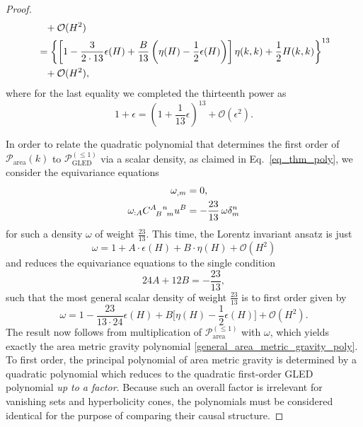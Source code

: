 \begin{proof}
\begin{equation}
\begin{aligned}
                              &{} \hphantom{=} + \mathcal O(H^2) \\
                              &{} = \left\{ \left\lbrack 1 - \frac{3}{2\cdot 13} \epsilon(H) + \frac{B}{13}\left(\eta(H) - \frac{1}{2}\epsilon(H) \right)\right\rbrack \eta(k,k) + \frac{1}{2} H(k,k) \right\}^{13} \\
                              &{} \hphantom{=} + \mathcal O(H^2),
  \end{aligned}
\end{equation}
where for the last equality we completed the thirteenth power as
\begin{equation}
  1 + \epsilon = \left( 1 + \frac{1}{13}\epsilon\right)^{13} + \mathcal O(\epsilon^2).
\end{equation}

In order to relate the quadratic polynomial that determines the first order of $\mathcal P_\text{area}(k)$ to $\mathcal P_\text{GLED}^{(\leq 1)}$ via a scalar density, as claimed in Eq.~\eqref{eq_thm_poly}, we consider the equivariance equations
\begin{equation}
  \begin{aligned}
    \omega_{,m} &{} = 0, \\
    \omega_{:A} \gmc{A}{B}{n}{m} u^B &{} = -\frac{23}{13}\,\omega \delta^n_m
  \end{aligned}
\end{equation}
for such a density $\omega$ of weight $\frac{23}{13}$. This time, the Lorentz invariant ansatz is just
\begin{equation}
  \omega = 1 + A\cdot \epsilon(H) + B\cdot \eta(H) + \mathcal O(H^2)
\end{equation}
and reduces the equivariance equations to the single condition
\begin{equation}
  24A + 12B = -\frac{23}{13},
\end{equation}
such that the most general scalar density of weight $\frac{23}{13}$ is to first order given by
\begin{equation}
  \omega = 1 - \frac{23}{13\cdot 24} \epsilon(H) + B \lbrack \eta(H) - \frac{1}{2} \epsilon(H)\rbrack + \mathcal O(H^2).
\end{equation}
The result now follows from multiplication of $\mathcal P_\text{area}^{(\leq 1)}$ with $\omega$, which yields exactly the area metric gravity polynomial \eqref{general_area_metric_gravity_poly}. To first order, the principal polynomial of area metric gravity is determined by a quadratic polynomial which reduces to the quadratic first-order GLED polynomial \emph{up to a factor}. Because such an overall factor is irrelevant for vanishing sets and hyperbolicity cones, the polynomials must be considered identical for the purpose of comparing their causal structure.
\end{proof}

